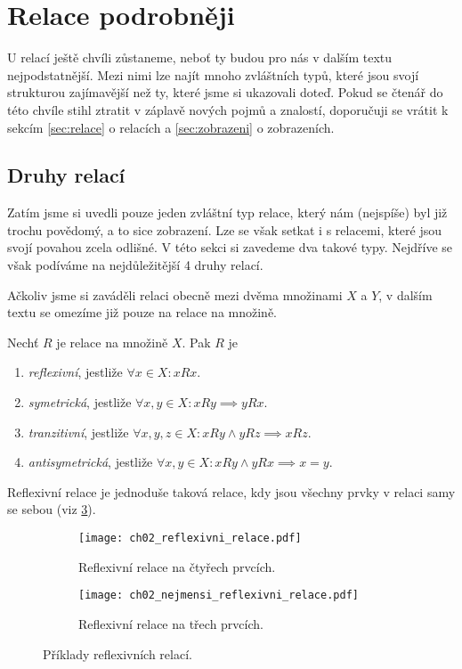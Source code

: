 \section{Relace podrobněji}\label{sec:relace_podrobneji}
U relací ještě chvíli zůstaneme, neboť ty budou pro nás v dalším textu nejpodstatnější. Mezi nimi lze najít mnoho zvláštních typů, které jsou svojí strukturou zajímavější než ty, které jsme si ukazovali doteď. Pokud se čtenář do této chvíle stihl ztratit v záplavě nových pojmů a znalostí, doporučuji se vrátit k sekcím \ref{sec:relace} o relacích a \ref{sec:zobrazeni} o zobrazeních.

\subsection{Druhy relací}\label{subsec:druhy_relaci}
Zatím jsme si uvedli pouze jeden zvláštní typ relace, který nám (nejspíše) byl již trochu povědomý, a to sice zobrazení. Lze se však setkat i s relacemi, které jsou svojí povahou zcela odlišné. V této sekci si zavedeme dva takové typy. Nejdříve se však podíváme na nejdůležitější 4 druhy relací.\par
Ačkoliv jsme si zaváděli relaci obecně mezi dvěma množinami $X$ a $Y$, v dalším textu se omezíme již pouze na relace na množině.
\begin{definition}\label{def:dulezite_druhy_relaci}
    Nechť $R$ je relace na množině $X$. Pak $R$ je
    \begin{enumerate}[label=(\roman*)]
        \item \emph{reflexivní}, jestliže $\forall x\in X: xRx$.
        \item \emph{symetrická}, jestliže $\forall x,y\in X: xRy \implies yRx$.
        \item \emph{tranzitivní}, jestliže $\forall x,y,z\in X: xRy \land yRz \implies xRz$.
        \item \emph{antisymetrická}, jestliže $\forall x,y\in X: xRy \land yRx \implies x=y$.
    \end{enumerate}
\end{definition}
Reflexivní relace je jednoduše taková relace, kdy jsou všechny prvky v relaci samy se sebou (viz \ref{fig:priklady_reflexivnich_relaci}).
\begin{figure}[H]
    \centering
    \begin{subfigure}{6cm}
        \centering
        \texttt{[image: ch02\_reflexivni\_relace.pdf]}
        \caption{Reflexivní relace na čtyřech prvcích.}
        \label{subfig:reflexivni_relace}
    \end{subfigure}
    \quad
    \begin{subfigure}{6cm}
        \centering
        \texttt{[image: ch02\_nejmensi\_reflexivni\_relace.pdf]}
        \caption{Reflexivní relace na třech prvcích.}
        \label{subfig:nejmensi_reflexivni_relace}
    \end{subfigure}
    \caption{Příklady reflexivních relací.}
    \label{fig:priklady_reflexivnich_relaci}
\end{figure}
